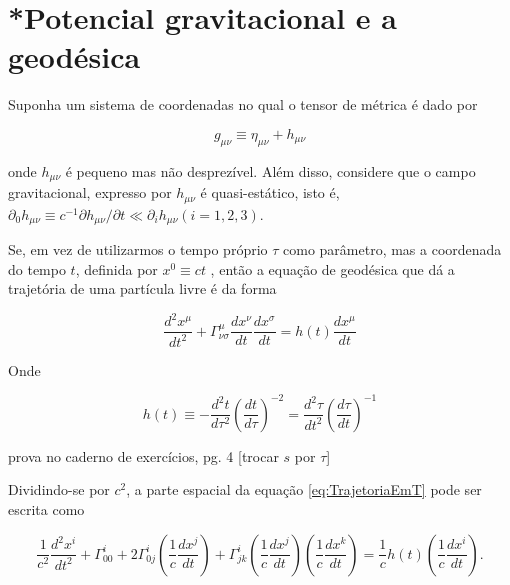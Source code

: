 \section{*Potencial gravitacional e a geodésica}\label{sec:PotencialGravitacionalGeodesica}

Suponha um sistema de coordenadas no qual o tensor de métrica é dado por

\begin{equation}\label{eq:TensorMetricaLocal}
g_{\mu \nu} \equiv \eta_{\mu \nu}+h_{\mu \nu}
\end{equation}

onde $ h_{\mu \nu} $ é pequeno mas não desprezível. Além disso, considere que o campo gravitacional, expresso por $ h_{\mu\nu} $ é quasi-estático, isto é, $ \partial_{0} h_{\mu \nu} \equiv c^{-1} \partial h_{\mu \nu} / \partial t \ll \partial_{i} h_{\mu \nu} (i=1,2,3) $.

Se, em vez de utilizarmos o tempo próprio $ \tau $ como parâmetro, mas a coordenada do tempo $ t $, definida por {\color{blue}$ x^0 \equiv ct $} %
, então a equação de geodésica que dá a trajetória de uma partícula livre é da forma

\begin{equation}\label{eq:TrajetoriaEmT}
\frac{d^{2} x^{\mu}}{d t^{2}}+\Gamma_{\nu \sigma}^{\mu} \frac{d x^{\nu}}{d t} \frac{d x^{\sigma}}{d t}=h(t) \frac{d x^{\mu}}{d t}
\end{equation}

Onde

\begin{equation}\label{eq:HDefinicao}
h(t) \equiv-\frac{d^{2} t}{d \tau^{2}}\left(\frac{d t}{d \tau}\right)^{-2}=\frac{d^{2} \tau}{d t^{2}}\left(\frac{d \tau}{d t}\right)^{-1}
\end{equation}

{\color{red} prova no caderno de exercícios, pg. 4 [trocar $ s $ por $ \tau $]}

Dividindo-se por $ c^2 $, a parte espacial da equação \eqref{eq:TrajetoriaEmT} pode ser escrita como

\begin{equation}\label{eq:TrajetoriaParteEspacial}
\frac{1}{c^{2}} \frac{d^{2} x^{i}}{d t^{2}}+\Gamma_{00}^{i}+2 \Gamma_{0 j}^{i}\left(\frac{1}{c} \frac{d x^{j}}{d t}\right)+\Gamma_{j k}^{i}\left(\frac{1}{c} \frac{d x^{j}}{d t}\right)\left(\frac{1}{c} \frac{d x^{k}}{d t}\right)=\frac{1}{c} h(t)\left(\frac{1}{c} \frac{d x^{i}}{d t}\right).
\end{equation}

